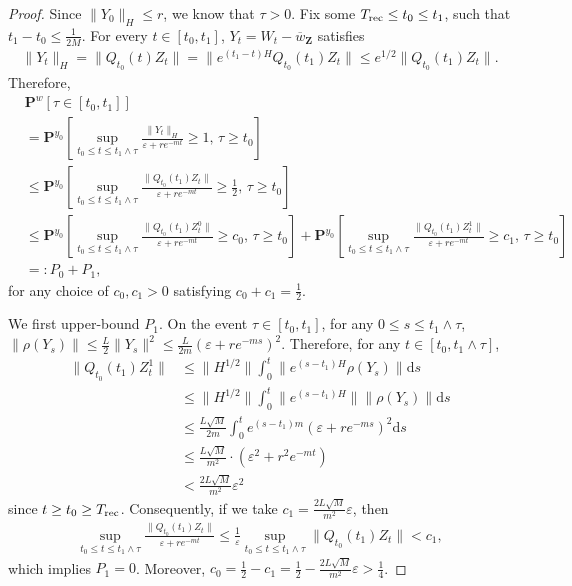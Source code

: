 \documentclass[final,12pt]{colt2018}
\numberwithin{equation}{section}
\numberwithin{equation}{section}
\def\PP{\mathbf{P}}
\def\bd#1{\mathbf{#1}}
\def\bZ{\bd{Z}}
\def\barw{\overline{w}}
\def\d{{\mathrm d}}
\def\eps{\varepsilon}
\begin{document}
\begin{proof}
Since $\|Y_0\|_H \le r$, we know that $\tau > 0$. Fix some $T_{\rm rec} \le t_0 \le t_1$, such that $t_1 - t_0 \le \frac{1}{2M}$. For every $t \in [t_0,t_1]$, $Y_t = W_t - \barw_\bZ$ satisfies
\begin{align*}
	\|Y_t\|_H = \|Q_{t_0}(t)Z_t\| = \|e^{(t_1-t)H}Q_{t_0}(t_1)Z_t\| \le e^{1/2}\|Q_{t_0}(t_1)Z_t\|.
\end{align*}
Therefore,
\begin{align*}
	&\PP^w\left[\tau \in [t_0,t_1]\right] \nonumber\\
	&= \PP^{y_0}\left[ \sup_{t_0 \le t \le t_1 \wedge \tau}\frac{\|Y_t\|_H}{\eps + r e^{-mt}} \ge 1, \, \tau \ge t_0 \right] \\
	&\le \PP^{y_0}\left[ \sup_{t_0 \le t \le t_1 \wedge \tau}\frac{\|Q_{t_0}(t_1)Z_t\|}{\eps + r e^{-mt}} \ge \frac{1}{2}, \, \tau \ge t_0 \right] \\
	&\le \PP^{y_0}\left[ \sup_{t_0 \le t \le t_1 \wedge \tau}\frac{\|Q_{t_0}(t_1)Z^0_t\|}{\eps + r e^{-mt}} \ge c_0, \, \tau \ge t_0 \right] + \PP^{y_0}\left[ \sup_{t_0 \le t \le t_1 \wedge \tau}\frac{\|Q_{t_0}(t_1)Z^1_t\|}{\eps + r e^{-mt}} \ge c_1, \, \tau \ge t_0 \right] \\
	&=: P_0 + P_1,
\end{align*}
for any choice of $c_0,c_1 > 0$ satisfying $c_0 + c_1 = \frac{1}{2}$.

	We first upper-bound $P_1$.  On the event $\tau \in [t_0, t_1]$, for any $0\leq s \le t_1 \wedge \tau$, $\| \rho(Y_s) \| \leq \frac{L}{2}\| Y_s\|^2 \leq \frac{L}{2m} (\eps + re^{-m s})^2$. Therefore, for any $t \in [t_0,t_1 \wedge \tau]$,
	    \begin{align*}
	    	\|Q_{t_0}(t_1)Z^1_t\| &\le \|H^{1/2}\|\int^t_0 \|e^{(s-t_1)H}\rho(Y_s)\|\d s \\
			&\le \|H^{1/2}\| \int^t_0 \|e^{(s-t_1)H}\| \|\rho(Y_s)\| \d s \\
			&\le \frac{L\sqrt{M}}{2m} \int^t_0 e^{(s-t_1)m} (\eps + re^{-m s})^2 \d s \\
			&\le \frac{L\sqrt{M}}{m^2} \cdot(\eps^2 + r^2 e^{-mt}) \\
			&< \frac{2L\sqrt{M}}{m^2}\eps^2
\end{align*}
since $t \ge t_0 \ge T_{\rm rec}$. Consequently, if we take $c_1 = \frac{2L\sqrt{M}}{m^2}\eps$, then
\begin{align*}
	\sup_{t_0 \le t \le t_1 \wedge \tau} \frac{\|Q_{t_0}(t_1)Z_t\|}{\eps + re^{-mt}} \le \frac{1}{\eps}\sup_{t_0 \le t \le t_1 \wedge \tau} \|Q_{t_0}(t_1)Z_t\| < c_1,
\end{align*}
which implies $P_1 = 0$. Moreover, $c_0 = \frac{1}{2}-c_1 = \frac{1}{2} - \frac{2L\sqrt{M}}{m^2}\eps > \frac{1}{4}$.


\end{proof}
\end{document}
